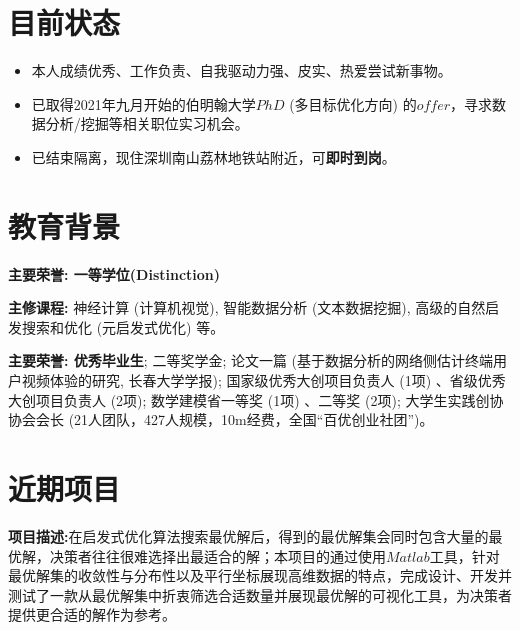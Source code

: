 \documentclass{resume}
\begin{document}



 
\section{目前状态}
\begin{itemize}[parsep=0.2ex]
\item 本人成绩优秀、工作负责、自我驱动力强、皮实、热爱尝试新事物。
\item 已取得2021年九月开始的伯明翰大学$PhD$ (多目标优化方向) 的$offer$，寻求数据分析/挖掘等相关职位实习机会。
\item 已结束隔离，现住深圳南山荔林地铁站附近，可\textbf{即时到岗}。
\end{itemize}

\section{教育背景}
\setlength{\parindent}{2em} \textbf{主要荣誉: 一等学位(Distinction)}

\setlength{\parindent}{2em} \textbf{主修课程:} 神经计算 (计算机视觉),  智能数据分析 (文本数据挖掘), 高级的自然启发搜索和优化 (元启发式优化) 等。



\setlength{\parindent}{2em}\textbf{主要荣誉: 优秀毕业生}; 二等奖学金;  论文一篇 (基于数据分析的网络侧估计终端用户视频体验的研究,  长春大学学报); 国家级优秀大创项目负责人 (1项) 、省级优秀大创项目负责人 (2项); 数学建模省一等奖 (1项) 、二等奖 (2项); 大学生实践创协协会会长 (21人团队，427人规模，10m经费，全国“百优创业社团”)。


\section{近期项目}


\setlength{\parindent}{2em}
\textbf{项目描述:}在启发式优化算法搜索最优解后，得到的最优解集会同时包含大量的最优解，决策者往往很难选择出最适合的解；本项目的通过使用$Matlab$工具，针对最优解集的收敛性与分布性以及平行坐标展现高维数据的特点，完成设计、开发并测试了一款从最优解集中折衷筛选合适数量并展现最优解的可视化工具，为决策者提供更合适的解作为参考。
\end{document}
